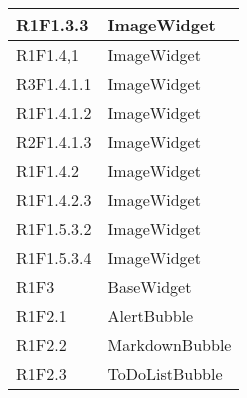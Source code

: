\begin{center}
\begin{longtable}{|p{3cm}|p{10cm}|}
		R1F1.3.3 & ImageWidget\newline \\ \hline
		R1F1.4,1 & ImageWidget\newline \\ \hline
		R3F1.4.1.1 & ImageWidget\newline \\ \hline
		R1F1.4.1.2 & ImageWidget\newline \\ \hline
		R2F1.4.1.3 & ImageWidget\newline \\ \hline
		R1F1.4.2 & ImageWidget\newline \\ \hline
		R1F1.4.2.3 & ImageWidget\newline \\ \hline
		R1F1.5.3.2 & ImageWidget\newline \\ \hline
		R1F1.5.3.4 & ImageWidget\newline \\ \hline
		R1F3 & BaseWidget\newline \\ \hline
		R1F2.1 & AlertBubble\newline \\ \hline
		R1F2.2 & MarkdownBubble\newline \\ \hline
		R1F2.3 & ToDoListBubble\newline \\ \hline
	\end{longtable}
\end{center}
